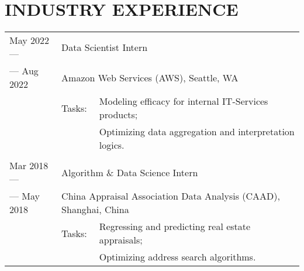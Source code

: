\documentclass[pdftex,11pt]{article}	%
\begin{document}
\section*{INDUSTRY EXPERIENCE}
\begin{tabularx}{\textwidth}{@{} p{2.7cm}  p{1.5cm} X @{}}
	May 2022 --- & \multicolumn{2}{l}{Data Scientist Intern} \\
	\hfill --- Aug 2022 & \multicolumn{2}{l}{Amazon Web Services (AWS), Seattle, WA} \\
	& Tasks: & Modeling efficacy for internal IT-Services products; \\ 
	& & Optimizing data aggregation and interpretation logics. \\
	& & \\
	Mar 2018 --- & \multicolumn{2}{l}{Algorithm \& Data Science Intern} \\
	\hfill --- May 2018 & \multicolumn{2}{l}{China Appraisal Association Data Analysis (CAAD), Shanghai, China} \\
	& Tasks: & Regressing and predicting real estate appraisals; \\
	& & Optimizing address search algorithms.
\end{tabularx}
\fi
%
%
\end{document}
